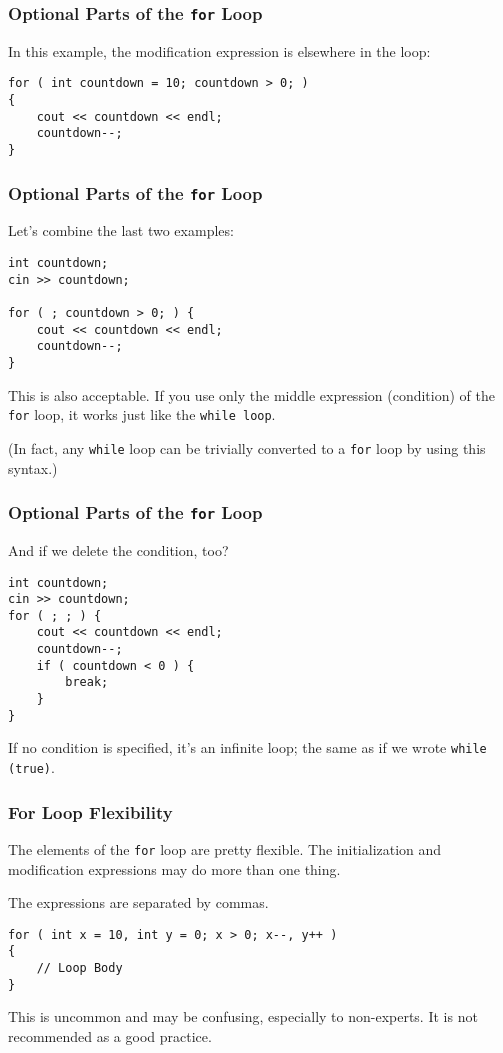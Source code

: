 \begin{frame}[fragile]
\frametitle{Optional Parts of the \texttt{for} Loop}

In this example, the modification expression is elsewhere in the loop:

\begin{verbatim}
for ( int countdown = 10; countdown > 0; )
{
    cout << countdown << endl;
    countdown--;
}
\end{verbatim}

\end{frame}

\begin{frame}[fragile]
\frametitle{Optional Parts of the \texttt{for} Loop}

Let's combine the last two examples:

\begin{verbatim}
int countdown; 
cin >> countdown;

for ( ; countdown > 0; ) {
    cout << countdown << endl;
    countdown--;
}
\end{verbatim}

This is also acceptable. If you use only the middle expression (condition) of the \texttt{for} loop, it works just like the \texttt{while loop}.

(In fact, any \texttt{while} loop can be trivially converted to a \texttt{for} loop by using this syntax.)

\end{frame}

\begin{frame}[fragile]
\frametitle{Optional Parts of the \texttt{for} Loop}

And if we delete the condition, too?

\begin{verbatim}
int countdown;
cin >> countdown;
for ( ; ; ) {
    cout << countdown << endl;
    countdown--;
    if ( countdown < 0 ) {
        break;
    }    
}
\end{verbatim}

If no condition is specified, it's an infinite loop; the same as if we wrote \texttt{while (true)}.

\end{frame}

\begin{frame}[fragile]
\frametitle{For Loop Flexibility}

The elements of the \texttt{for} loop are pretty flexible. The initialization and modification expressions may do more than one thing.

The expressions are separated by commas.

\begin{verbatim}
for ( int x = 10, int y = 0; x > 0; x--, y++ )
{
    // Loop Body
}
\end{verbatim}

This is uncommon and may be confusing, especially to non-experts. It is not recommended as a good practice.

\end{frame}

